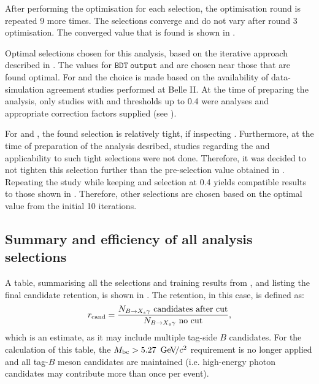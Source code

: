 After performing the optimisation for each selection, the optimisation round is repeated 9 more times.
The selections converge and do not vary after round 3 optimisation.
The converged value that is found is shown in .

\begin{table}[htbp!]
    \centering
    \caption{\label{tab:interative_optimisation} Optimal selections chosen for this analysis, based on the iterative approach described in .
    The values for $\mathtt{BDT~output}$ and \ZMVA are chosen near those that are found optimal.
    For \piVeto and \etaVeto the choice is made based on the availability of data-simulation agreement studies performed at Belle II.
    At the time of preparing the analysis, 
    only studies with \piVeto and \etaVeto thresholds 
    up to 0.4 were analyses and appropriate correction factors supplied (see ).
    }
    
\end{table}

For \piVeto and \etaVeto, the found selection is relatively tight, if inspecting .
Furthermore, at the time of preparation of the analysis desribed, studies regarding the \piVeto and \etaVeto applicability to such tight selections were not done.
Therefore, it was decided to not tighten this selection further than the pre-selection value obtained in .
Repeating the study while keeping \piVeto and \etaVeto selection at 0.4 yields compatible results to those shown in .
Therefore, other selections are chosen based on the optimal value from the initial 10 iterations.

\subsection{Summary and efficiency of all analysis selections}\label{sec:selection_summary}

A table, summarising all the selections and \BDT training results from ,
and listing the final \BtoXsgamma candidate retention, is shown in .
The retention, in this case, is defined as:
\begin{equation}\label{eq:loose_efficiency}
    r_{\mathrm{cand}} = \frac{N_{\BtoXsgamma}~\mathrm{candidates~after~cut}}{N_{\BtoXsgamma}~\mathrm{no~cut}},
\end{equation}
which is an estimate, as it may include multiple tag-side $B$ candidates.
For the calculation of this table, the ${M_{\mathrm{bc}}}>5.27~{\mathrm{\,Ge\kern -0.1em V\!/}c^2}$ requirement is no longer applied and all tag-$B$ meson candidates are maintained (i.e. high-energy photon candidates may contribute more than once per event).

